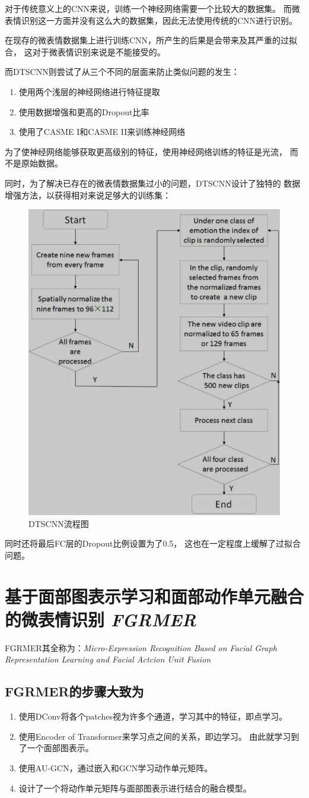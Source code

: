 \documentclass[AutoFakeBold]{MyFormat}
\begin{document}
\par 对于传统意义上的CNN来说，训练一个神经网络需要一个比较大的数据集。
而微表情识别这一方面并没有这么大的数据集，因此无法使用传统的CNN进行识别。
\par 在现存的微表情数据集上进行训练CNN，所产生的后果是会带来及其严重的过拟合，
这对于微表情识别来说是不能接受的。
\par 而DTSCNN则尝试了从三个不同的层面来防止类似问题的发生：
\begin{enumerate}
    \item 使用两个浅层的神经网络进行特征提取
    \item 使用数据增强和更高的Dropout比率
    \item 使用了CASME I和CASME II来训练神经网络
\end{enumerate}
\hspace*{\fill}
\par 为了使神经网络能够获取更高级别的特征，使用神经网络训练的特征是光流，
而不是原始数据。
\par 同时，为了解决已存在的微表情数据集过小的问题，DTSCNN设计了独特的
数据增强方法，以获得相对来说足够大的训练集：
\begin{figure}[!h]
    \centering
    \includegraphics[width=0.4\linewidth]{figures/2022.05.24/DTSCNN.png}
    \caption{DTSCNN流程图}
\end{figure}
\par 同时还将最后FC层的Dropout比例设置为了0.5，
这也在一定程度上缓解了过拟合问题。

\section{基于面部图表示学习和面部动作单元融合的微表情识别
\textit{FGRMER}}
\par FGRMER其全称为：\textit{Micro-Expression Recognition Based on Facial
Graph Representation Learning and Facial Actcion Unit Fusion}
\subsection{FGRMER的步骤大致为}
\begin{enumerate}
    \item 使用DConv将各个patches视为许多个通道，学习其中的特征，即点学习。
    \item 使用Encoder of Transformer来学习点之间的关系，即边学习。
    由此就学习到了一个面部图表示。
    \item 使用AU-GCN，通过嵌入和GCN学习动作单元矩阵。
    \item 设计了一个将动作单元矩阵与面部图表示进行结合的融合模型。
\end{enumerate}
\end{document}
